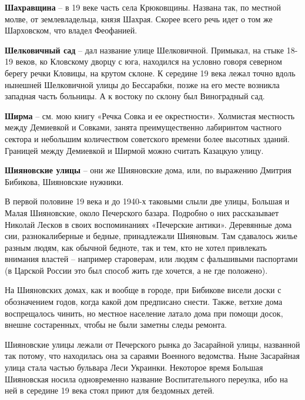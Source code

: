 \medskip

\textbf{Шахравщина} – в 19 веке часть села Крюковщины. Названа так, по местной молве, от землевладельца, князя Шахрая. Скорее всего речь идет о том же Шарховском, что владел Феофанией.\\

\medskip

\textbf{Шелковичный сад} – дал название улице Шелковичной. Примыкал, на стыке 18-19 веков, ко Кловскому дворцу с юга, находился на условно говоря северном берегу речки Кловицы, на крутом склоне. К середине 19 века лежал точно вдоль нынешней Шелковичной улицы до Бессарабки, позже на его месте возникла западная часть больницы. А к востоку по склону был Виноградный сад.\\

\medskip

\textbf{Ширма} – см. мою книгу «Речка Совка и ее окрестности». Холмистая местность между Демиевкой и Совками, занята преимущественно лабиринтом частного сектора и небольшим количеством советского времени более высотных зданий. Границей между Демиевкой и Ширмой можно считать Казацкую улицу.\\

\medskip

\textbf{Шияновские улицы} – они же Шияновские дома, или, по выражению Дмитрия Бибикова, Шияновские нужники.

В первой половине 19 века и до 1940-х таковыми слыли две улицы, Большая и Малая Шияновские, около Печерского базара. Подробно о них рассказывает Николай Лесков в своих воспоминаниях «Печерские антики». Деревянные дома сии, разнокалиберные и бедные, принадлежали Шияновым. Там сдавалось жилье разным людям, как обычной бедноте, так и тем, кто не хотел привлекать внимания властей – например староверам, или людям с фальшивыми паспортами (в Царской России это был способ жить где хочется, а не где положено).

На Шияновских домах, как и вообще в городе, при Бибикове висели доски с обозначением годов, когда какой дом предписано снести. Также, ветхие дома воспрещалось чинить, но местное население латало дома при помощи досок, внешне состаренных, чтобы не были заметны следы ремонта.

Шияновские улицы лежали от Печерского рынка до Засарайной улицы, названной так потому, что находилась она за сараями Военного ведомства. Ныне Засарайная улица стала частью бульвара Леси Украинки. Некоторое время Большая Шияновская носила одновременно название Воспитательного переулка, ибо на ней в середине 19 века стоял приют для бездомных детей.

